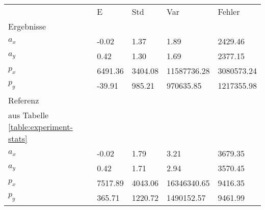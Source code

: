 \begin{tabular}{l|l|l|l|l}

     & E   & Std    & Var    & Fehler \\
\hhline{=|=|=|=|=}

Ergebnisse & & & & \\
$a_x$  &        -0.02 &         1.37 &         1.89 &      2429.46 \\
$a_y$  &         0.42 &         1.30 &         1.69 &      2377.15 \\
$p_x$  &      6491.36 &      3404.08 &  11587736.28 &   3080573.24 \\
$p_y$  &       -39.91 &       985.21 &    970635.85 &   1217355.98 \\

\hline
Referenz & & & & \\
aus Tabelle  \ref{table:experiment-stats} & & & & \\
$a_x$  &        -0.02 &         1.79 &         3.21 &      3679.35 \\
$a_y$  &         0.42 &         1.71 &         2.94 &      3570.45 \\
$p_x$  &      7517.89 &      4043.06 &  16346340.65 &      9416.35 \\
$p_y$  &       365.71 &      1220.72 &   1490152.57 &      9461.99 \\
\end{tabular}
